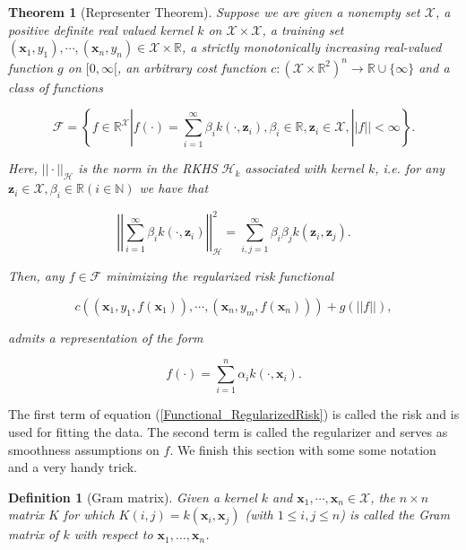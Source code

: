 \documentclass[12pt,a4paper,oneside]{book}
\newtheorem{Definition}{Definition}
\newtheorem{Theorem}{Theorem}
\begin{document}
\begin{Theorem}[Representer Theorem]\label{Functional_Representer}
Suppose we are given a nonempty set $\mathcal{X}$, a positive definite real valued kernel $k$ on $\mathcal{X} \times \mathcal{X}$, a training set $(\bm{x}_1,y_1), \cdots, (\bm{x}_n,y_n) \in \mathcal{X} \times \mathbb{R}$, a strictly monotonically increasing real-valued function $g$ on $[0, \infty [$, an arbitrary cost function $c : (\mathcal{X} \times \mathbb{R}^2)^n \rightarrow \mathbb{R} \cup \lbrace \infty \rbrace$ and a class of functions

\begin{equation}
\mathcal{F} = \left\{ f \in \mathbb{R}^{\mathcal{X}} | f(\cdot) = \sum\limits_{i=1}^{\infty} \beta_i k(\cdot,\bm{z}_i) , \beta_i \in \mathbb{R}, \bm{z}_i \in \mathcal{X} , || f|| < \infty \right\}.
\end{equation} 

Here, $||\cdot ||_{\mathcal{H}}$ is the norm in the RKHS $\mathcal{H}_k$ associated with kernel $k$, i.e. for any $\bm{z}_i \in \mathcal{X}, \beta_i \in \mathbb{R} (i \in \mathbb{N})$ we have that 

\begin{equation}
\left| \left| \sum\limits_{i=1}^{\infty} \beta_i k(\cdot,\bm{z}_i) \right|\right|_{\mathcal{H}}^2  = \sum\limits_{i,j=1}^{\infty} \beta_i \beta_j k(\bm{z}_i,\bm{z}_j).
\end{equation}

Then, any $f \in \mathcal{F}$ minimizing the regularized risk functional 

\begin{equation}\label{Functional_RegularizedRisk}
c((\bm{x}_1, y_1, f(\bm{x}_1)), \cdots , (\bm{x}_n, y_m, f(\bm{x}_n))) + g(||f||),
\end{equation}

admits a representation of the form 

\begin{equation}
f(\cdot) = \sum\limits_{i=1}^{n} \alpha_i k(\cdot,\bm{x}_i).
\end{equation}
\end{Theorem}

The first term of equation (\ref{Functional_RegularizedRisk}) is called the risk and is used for fitting the data. The second term is called the regularizer and serves as smoothness assumptions on $f$. We finish this section with some some notation and a very handy trick.

\begin{Definition}[Gram matrix]
Given a kernel $k$ and $\bm{x}_1,\cdots,\bm{x}_n \in \mathcal{X}$, the $n \times n$ matrix $K$ for which $K(i,j) = k(\bm{x}_i,\bm{x}_j)$ (with $1\leq i,j\leq n$) is called the Gram matrix of $k$ with respect to $\bm{x}_1, \ldots, \bm{x}_n$.
\end{Definition}
\end{document}
